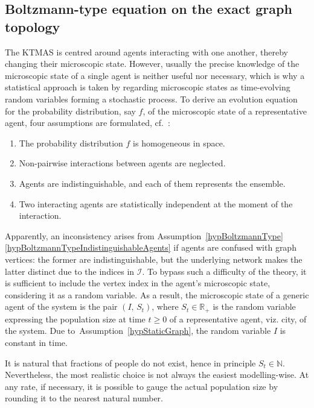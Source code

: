 \documentclass[a4paper]{article}
\newcommand{\R}{\mathbb{R}}
\begin{document}
\subsection{Boltzmann-type equation on the exact graph topology}
\label{secExactBoltzmannType}
%
The KTMAS is centred around agents interacting with one another, thereby changing their microscopic state. However, usually the precise knowledge of the microscopic state of a single agent is neither useful nor necessary, which is why a statistical approach is taken by regarding microscopic states as time-evolving random variables forming a stochastic process. To derive an evolution equation for the probability distribution, say $f$, of the microscopic state of a representative agent, four assumptions are formulated, cf.~\cite{Loy2025EKTMAS}:
\begin{hyp} \label{hypBoltzmannType}
\begin{enumerate}[before=\leavevmode,label=(\roman*)]
\item\label{hypBoltzmannTypeHomogeneousDensity} The probability distribution $f$ is homogeneous in space.
\item\label{hypBoltzmannTypeBinaryInteractions} Non-pairwise interactions between agents are neglected.
\item\label{hypBoltzmannTypeIndistinguishableAgents} Agents are indistinguishable, and each of them represents the ensemble.
\item\label{hypBoltzmannTypeMolecularChaos} Two interacting agents are statistically independent at the moment of the interaction.
\end{enumerate}
\end{hyp}

Apparently, an inconsistency arises from Assumption~\ref{hypBoltzmannType}\ref{hypBoltzmannTypeIndistinguishableAgents} if agents are confused with graph vertices: the former are indistinguishable, but the underlying network makes the latter distinct due to the indices in $\mathcal I$. To bypass such a difficulty of the theory, it is sufficient to include the vertex index in the agent's microscopic state, considering it as a random variable. As a result, the microscopic state of a generic agent of the system is the pair $(I,\,S_t)$, where $S_t\in\R_+$ is the random variable expressing the population size at time $t\geq 0$ of a representative agent, viz. city, of the system. Due to~Assumption~\ref{hypStaticGraph}, the random variable $I$ is constant in time.

\begin{rmk} \label{rmkPopulationNumericalNature}
It is natural that fractions of people do not exist, hence in principle $S_t\in\mathbb N$. Nevertheless, the most realistic choice is not always the easiest modelling-wise. At any rate, if necessary, it is possible to gauge the actual population size by rounding it to the nearest natural number.
\end{rmk}
\end{document}
